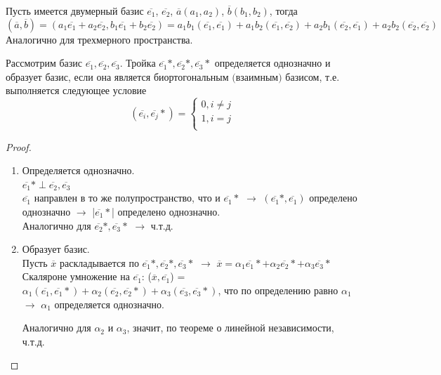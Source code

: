 Пусть имеется двумерный базис $\overline{e_1}$, $\overline{e_2}$, $\overline{a}(a_1, a_2)$, $\overline{b}(b_1, b_2)$, тогда
\[
(\overline{a}, \overline{b}) = (a_1\overline{e_1} + a_2\overline{e_2}, b_1\overline{e_1} + b_2\overline{e_2}) = a_1 b_1(\overline{e_1}, \overline{e_1}) + a_1 b_2(\overline{e_1}, \overline{e_2}) + a_2 b_1(\overline{e_2}, \overline{e_1}) + a_2 b_2(\overline{e_2}, \overline{e_2})
\]
Аналогично для трехмерного пространства.\\

\begin{theorem}
    Рассмотрим базис $\overline{e_1}, \overline{e_2}, \overline{e_3}$. Тройка $\overline{e_1}*, \overline{e_2}*, \overline{e_3}*$ определяется однозначно и образует базис, если она является $\textit{биортогональным (взаимным)}$ базисом, т.е. выполняется следующее условие
    \[
    (\overline{e_i}, \overline{e_j}*) = 
    \begin{cases}
        0, i \neq  j\\
        1, i = j\\
    \end{cases}
    \]
\end{theorem}

\begin{proof}
    \tab\\
    \begin{enumerate}
        \item Определяется однозначно.\\
            
        $\overline{e_1}* \perp \overline{e_2}, \overline{e_3}$\\
        $\overline{e_1}$ направлен в то же полупространство, что и $\overline{e_1}*$ $\longrightarrow$ $(\overline{e_1}*, \overline{e_1})$ определено однозначно $\longrightarrow$ |$\overline{e_1}*$| определено однозначно.\\
        Аналогично для $\overline{e_2}*, \overline{e_3}*$ $\longrightarrow$ ч.т.д.

        \item Образует базис.\\

        Пусть $\overline{x}$ раскладывается по $\overline{e_1}*, \overline{e_2}*, \overline{e_3}*$ $\longrightarrow$ $\overline{x} = \alpha_1\overline{e_1}* + \alpha_2\overline{e_2}* + \alpha_3\overline{e_3}*$\\
        Скаляроне умножение на $\overline{e_1}$: ($\overline{x}, \overline{e_1}$) = $\alpha_1(\overline{e_1}, \overline{e_1}*) + \alpha_2(\overline{e_2}, \overline{e_2}*) + \alpha_3(\overline{e_3}, \overline{e_3}*)$, что по определению равно $\alpha_1$ $\longrightarrow$ $\alpha_1$ определяется однозначно.

        Аналогично для $\alpha_2$ и $\alpha_3$, значит, по теореме о линейной независимости, ч.т.д.
    \end{enumerate}
\end{proof}

